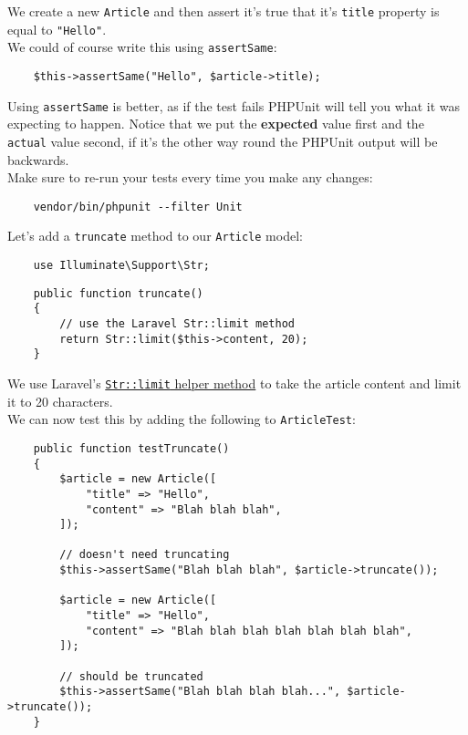We create a new \texttt{Article} and then assert it's true that it's \texttt{title} property is equal to \texttt{"Hello"}.
\\

We could of course write this using \texttt{assertSame}:

\begin{verbatim}
    $this->assertSame("Hello", $article->title);
\end{verbatim}

Using \texttt{assertSame} is better, as if the test fails PHPUnit will tell you what it was expecting to happen. Notice that we put the \textbf{expected} value first and the \texttt{actual} value second, if it's the other way round the PHPUnit output will be backwards.
\\

Make sure to re-run your tests every time you make any changes:

\begin{verbatim}
    vendor/bin/phpunit --filter Unit
\end{verbatim}

Let's add a \texttt{truncate} method to our \texttt{Article} model:

\begin{verbatim}
    use Illuminate\Support\Str;
\end{verbatim}

\begin{verbatim}
    public function truncate()
    {
        // use the Laravel Str::limit method
        return Str::limit($this->content, 20);
    }
\end{verbatim}

We use Laravel's \href{http://laravel.com/docs/6.x/helpers#method-str-limit}{\texttt{Str::limit} helper method} to take the article content and limit it to 20 characters.
\\

We can now test this by adding the following to \texttt{ArticleTest}:

\begin{verbatim}
    public function testTruncate()
    {
        $article = new Article([
            "title" => "Hello",
            "content" => "Blah blah blah",
        ]);

        // doesn't need truncating
        $this->assertSame("Blah blah blah", $article->truncate());

        $article = new Article([
            "title" => "Hello",
            "content" => "Blah blah blah blah blah blah blah",
        ]);

        // should be truncated
        $this->assertSame("Blah blah blah blah...", $article->truncate());
    }
\end{verbatim}


